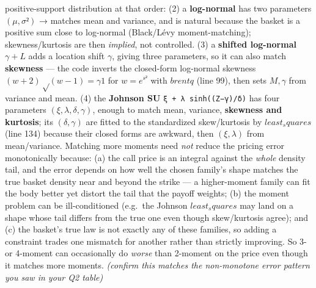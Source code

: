 \documentclass[
  11pt,
]{article}
\begin{document}
\begin{enumerate}
  positive-support distribution at that order: (2) a \textbf{log-normal}
  has two parameters \((μ,σ²)\) → matches mean and variance, and is
  natural because the basket is a positive sum close to log-normal
  (Black/Lévy moment-matching); skewness/kurtosis are then
  \emph{implied}, not controlled. (3) a \textbf{shifted log-normal}
  \(γ + L\) adds a location shift \(γ\), giving three parameters, so it
  can also match \textbf{skewness} --- the code inverts the closed-form
  log-normal skewness \((w+2)√(w−1) = γ1\) for \(w = e^{s²}\) with
  \(brentq\) (line 99), then sets \(M, γ\) from variance and mean. (4)
  the \textbf{Johnson SU} \texttt{ξ\ +\ λ\ sinh((Z−γ)/δ)} has four
  parameters \((ξ,λ,δ,γ)\), enough to match mean, variance,
  \textbf{skewness and kurtosis}; its \((δ,γ)\) are fitted to the
  standardized skew/kurtosis by \(least_squares\) (line 134) because
  their closed forms are awkward, then \((ξ,λ)\) from mean/variance.
  Matching more moments need \emph{not} reduce the pricing error
  monotonically because: (a) the call price is an integral against the
  \emph{whole} density tail, and the error depends on how well the
  chosen family's shape matches the true basket density near and beyond
  the strike --- a higher-moment family can fit the body better yet
  distort the tail that the payoff weights; (b) the moment problem can
  be ill-conditioned (e.g.~the Johnson \(least_squares\) may land on a
  shape whose tail differs from the true one even though skew/kurtosis
  agree); and (c) the basket's true law is not exactly any of these
  families, so adding a constraint trades one mismatch for another
  rather than strictly improving. So 3- or 4-moment can occasionally do
  \emph{worse} than 2-moment on the price even though it matches more
  moments. \emph{(confirm this matches the non-monotone error pattern
  you saw in your Q2 table)}
\end{enumerate}
\end{document}
